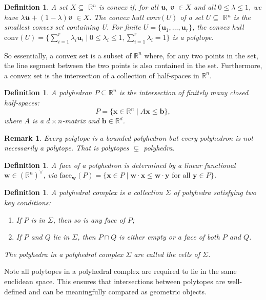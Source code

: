 \documentclass[11pt,reqno,a4paper]{article}
\theoremstyle{theoremstyle}
\theoremstyle{examplestyle}
\newtheorem{definition}[theorem]{Definition}
\newtheorem{remark}[theorem]{Remark}
\theoremstyle{algorithmstyle}
\numberwithin{equation}{subsection}
\newcommand{\RR}{\mathbb{R}}
\begin{document}
\begin{definition}
    A set $X \subseteq$ \( \mathbb{R} \)$^n$ is \textit{convex} if, for all \textbf{u}, \textbf{v} $\in X$ and all $0 \leq \lambda \leq 1$, we have $\lambda$\textbf{u} $+ \: (1-\lambda)$\textbf{v} $\in X$.
    The convex hull conv$(U)$ of a set $U \subseteq$ \( \mathbb{R} \)$^n$ is the smallest convex set containing U. For finite $U = \{\mathbf{u}_1,\ldots,\mathbf{u}_r\}$, the \textit{convex hull} $\text{conv}(U) = \{\sum_{i=1}^r\lambda_i\mathbf{u}_i \; | \; 0\leq\lambda_i\leq1, \sum_{i=1}^r\lambda_i = 1\}$ is a polytope.
\end{definition}

So essentially, a convex set is a subset of $\RR^n$ where, for any two points in the set, the line segment between the two points is also contained in the set. Furthermore, a convex set is the intersection of a collection of half-spaces in $\RR^n$.

\begin{definition}
    A \textit{polyhedron} $P\subseteq \RR^n$ is the intersection of finitely many closed half-spaces:\[P = \{\mathbf{x}\in\RR^n \;| \;A\mathbf{x}\leq\mathbf{b}\},\] where $A$ is a $d \times n$-matrix and $\mathbf{b}\in\RR^d$.
\end{definition}
\begin{remark}
    Every polytope is a bounded polyhedron but every polyhedron is not necessarily a polytope. That is polytopes $\subsetneq$ polyhedra.
\end{remark}

\begin{definition}
    A \textit{face} of a polyhedron is determined by a linear functional $\mathbf{w} \in (\RR^n)^\vee$, via $\text{face}_{\textbf{w}}(P ) = \{\textbf{x} \in P \; | \; \textbf{w} \cdot \textbf{x} \leq \textbf{w} \cdot \textbf{y} \text{ for all } \textbf{y} \in P \}$.    
\end{definition}


\begin{definition}
    A \textit{polyhedral complex} is a collection $\Sigma$ of polyhedra satisfying two key conditions:
\begin{enumerate}[label = \textit{(\arabic*)}]
    \item If $P$ is in $\Sigma$, then so is any face of $P$;
    \item If $P$ and $Q$ lie in $\Sigma$, then $P \cap Q$ is either empty or a face of both $P$ and $Q$.
\end{enumerate}
The polyhedra in a polyhedral complex $\Sigma$ are called the \textit{cells} of $\Sigma$.
\end{definition}
Note all polytopes in a polyhedral complex are required to lie in the same  euclidean space. This ensures that intersections between polytopes are well-defined and can be meaningfully compared as geometric objects.
\end{document}
